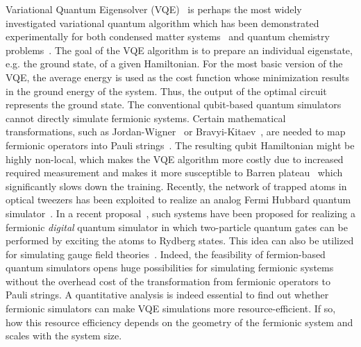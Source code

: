 \documentclass[aps, prx, reprint, superscriptaddress]{revtex4-2}
\begin{document}
Variational Quantum Eigensolver (VQE)~\cite{peruzzo2014variational,wang2019accelerated, wu2021expressivity,tilly2022variational,uvarov2020variational} is perhaps the most widely investigated variational quantum algorithm which has been demonstrated experimentally for both condensed matter systems~\cite{ 
sagastizabal2021variational,kokail2019self,bravo2020scaling} and quantum chemistry problems~\cite{kandala2017hardware,li2019variational,google2020hartree,metcalf2020resource,cai2020quantum,zhang2021shallow, delgado2021variational,yoshikawa2022quantum}. The goal of the VQE algorithm is to prepare an individual eigenstate, e.g. the ground state, of a given Hamiltonian. For the most basic version of the VQE, the average energy is used as the cost function whose minimization results in the ground energy of the system. Thus, the output of the optimal circuit represents the ground state.  The conventional qubit-based quantum simulators cannot directly simulate fermionic systems. Certain mathematical transformations, such as Jordan-Wigner~\cite{jordan1993paulische,lieb1961two,batista2001generalized,derzhko2001jordan} or Bravyi-Kitaev~\cite{bravyi2002fermionic}, are needed to map  fermionic operators into Pauli strings~\cite{stanisic2022observing}. The resulting qubit Hamiltonian might be highly non-local, which makes the VQE algorithm more costly due to increased required measurement and makes it more susceptible to Barren plateau~\cite{mcclean2018barren,wang2021noise,uvarov2021barren,cerezo2021cost, kim2021universal, larocca2023theory} which significantly slows down the training. 
Recently, the network of trapped atoms in optical tweezers has been exploited to realize an analog Fermi Hubbard quantum simulator~\cite{norcia2018microscopic,yan2022two,spar2022realization}. In a recent proposal~\cite{gonzalez2023fermionic}, such systems have been proposed for realizing a fermionic \emph{digital} quantum simulator in which two-particle quantum gates can be performed by exciting the atoms to Rydberg states. This idea can also be utilized for simulating gauge field theories~\cite{gonzalez2022hardware,zache2023fermion}. Indeed, the feasibility of fermion-based quantum simulators opens huge possibilities for simulating fermionic systems without the overhead cost of the transformation from fermionic operators to Pauli strings.
A quantitative analysis is indeed essential to find out whether fermionic simulators can make VQE simulations more resource-efficient. If so, how this resource efficiency depends on the geometry of the fermionic system and scales with the system size. 
\end{document}
